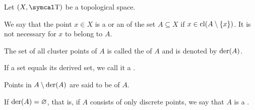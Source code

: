 \begin{definition}\label{def:topological_derived_set}\cite[24]{Engelking1989}
  Let \( (X, \CT) \) be a topological space.

  \begin{defenum}
     We say that the point \( x \in X \) is a  or an  of the set \( A \subseteq X \) if \( x \in \operatorname{cl}(A \setminus \{ x \}) \). It is not necessary for \( x \) to belong to \( A \).

     The set of all cluster points of \( A \) is called the  of \( A \) and is denoted by \( \operatorname{der}(A) \).

     If a set equals its derived set, we call it a .

     Points in \( A \setminus \operatorname{der}(A) \) are said to be  of \( A \).

     If \( \operatorname{der}(A) = \varnothing \), that is, if \( A \) consists of only discrete points, we say that \( A \) is a .
  \end{defenum}
\end{definition}

